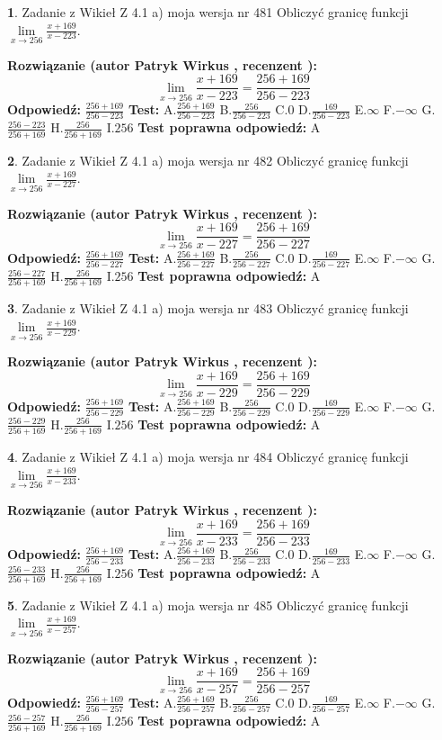 \documentclass[12pt, a4paper]{article}
\theoremstyle{definition} %
\newtheorem{zad}{}
\newcommand{\zadStart}[1]{\begin{zad}#1\newline}
\newcommand{\zadStop}{\end{zad}}
\newcommand{\rozwStart}[2]{\noindent \textbf{Rozwiązanie (autor #1 , recenzent #2): }\newline}
\newcommand{\rozwStop}{\newline}
\newcommand{\odpStart}{\noindent \textbf{Odpowiedź:}\newline}
\newcommand{\odpStop}{\newline}
\newcommand{\testStart}{\noindent \textbf{Test:}\newline}
\newcommand{\testStop}{\newline}
\newcommand{\kluczStart}{\noindent \textbf{Test poprawna odpowiedź:}\newline}
\newcommand{\kluczStop}{\newline}
\begin{document}
\zadStart{Zadanie z Wikieł Z 4.1 a) moja wersja nr 481}
Obliczyć granicę funkcji $\lim\limits_{x\to256}\frac{x+169}{x-223}$.
\zadStop
\rozwStart{Patryk Wirkus}{}
$$\lim\limits_{x\to256}\frac{x+169}{x-223} = \frac{256+169}{256-223}$$
\rozwStop
\odpStart
$\frac{256+169}{256-223}$
\odpStop
\testStart
A.$\frac{256+169}{256-223}$
B.$\frac{256}{256-223}$
C.$0$
D.$\frac{169}{256-223}$
E.$\infty$
F.$-\infty$
G.$\frac{256-223}{256+169}$
H.$\frac{256}{256+169}$
I.$256$
\testStop
\kluczStart
A
\kluczStop



\zadStart{Zadanie z Wikieł Z 4.1 a) moja wersja nr 482}
Obliczyć granicę funkcji $\lim\limits_{x\to256}\frac{x+169}{x-227}$.
\zadStop
\rozwStart{Patryk Wirkus}{}
$$\lim\limits_{x\to256}\frac{x+169}{x-227} = \frac{256+169}{256-227}$$
\rozwStop
\odpStart
$\frac{256+169}{256-227}$
\odpStop
\testStart
A.$\frac{256+169}{256-227}$
B.$\frac{256}{256-227}$
C.$0$
D.$\frac{169}{256-227}$
E.$\infty$
F.$-\infty$
G.$\frac{256-227}{256+169}$
H.$\frac{256}{256+169}$
I.$256$
\testStop
\kluczStart
A
\kluczStop



\zadStart{Zadanie z Wikieł Z 4.1 a) moja wersja nr 483}
Obliczyć granicę funkcji $\lim\limits_{x\to256}\frac{x+169}{x-229}$.
\zadStop
\rozwStart{Patryk Wirkus}{}
$$\lim\limits_{x\to256}\frac{x+169}{x-229} = \frac{256+169}{256-229}$$
\rozwStop
\odpStart
$\frac{256+169}{256-229}$
\odpStop
\testStart
A.$\frac{256+169}{256-229}$
B.$\frac{256}{256-229}$
C.$0$
D.$\frac{169}{256-229}$
E.$\infty$
F.$-\infty$
G.$\frac{256-229}{256+169}$
H.$\frac{256}{256+169}$
I.$256$
\testStop
\kluczStart
A
\kluczStop



\zadStart{Zadanie z Wikieł Z 4.1 a) moja wersja nr 484}
Obliczyć granicę funkcji $\lim\limits_{x\to256}\frac{x+169}{x-233}$.
\zadStop
\rozwStart{Patryk Wirkus}{}
$$\lim\limits_{x\to256}\frac{x+169}{x-233} = \frac{256+169}{256-233}$$
\rozwStop
\odpStart
$\frac{256+169}{256-233}$
\odpStop
\testStart
A.$\frac{256+169}{256-233}$
B.$\frac{256}{256-233}$
C.$0$
D.$\frac{169}{256-233}$
E.$\infty$
F.$-\infty$
G.$\frac{256-233}{256+169}$
H.$\frac{256}{256+169}$
I.$256$
\testStop
\kluczStart
A
\kluczStop



\zadStart{Zadanie z Wikieł Z 4.1 a) moja wersja nr 485}
Obliczyć granicę funkcji $\lim\limits_{x\to256}\frac{x+169}{x-257}$.
\zadStop
\rozwStart{Patryk Wirkus}{}
$$\lim\limits_{x\to256}\frac{x+169}{x-257} = \frac{256+169}{256-257}$$
\rozwStop
\odpStart
$\frac{256+169}{256-257}$
\odpStop
\testStart
A.$\frac{256+169}{256-257}$
B.$\frac{256}{256-257}$
C.$0$
D.$\frac{169}{256-257}$
E.$\infty$
F.$-\infty$
G.$\frac{256-257}{256+169}$
H.$\frac{256}{256+169}$
I.$256$
\testStop
\kluczStart
A
\kluczStop
\end{document}
